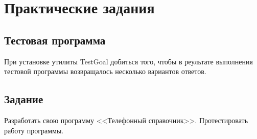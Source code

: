 \chapter{Практические задания}

\section{Тестовая программа}

При установке утилиты TestGoal добиться того, чтобы в реультате выполнения
тестовой программы возвращалось несколько вариантов ответов.


\section{Задание}

Разработать свою программу <<Телефонный справочник>>. Протестировать работу
программы.


